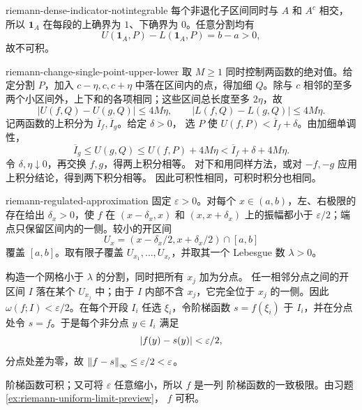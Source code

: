\begin{solution}{riemann-dense-indicator-notintegrable}
每个非退化子区间同时与 \(A\) 和 \(A^c\) 相交，所以
\(\mathbf1_A\) 在每段的上确界为 \(1\)、下确界为 \(0\)。任意分割均有
\[
 U(\mathbf1_A,P)-L(\mathbf1_A,P)=b-a>0,
\]
故不可积。
\end{solution}

\begin{solution}{riemann-change-single-point-upper-lower}
取 \(M\ge1\) 同时控制两函数的绝对值。给定分割 \(P\)，加入
\(c-\eta,c,c+\eta\) 中落在区间内的点，得加细 \(Q\)。除与 \(c\)
相邻的至多两个小区间外，上下和的各项相同；这些区间总长度至多
\(2\eta\)，故
\[
 |U(f,Q)-U(g,Q)|\le4M\eta,\qquad
 |L(f,Q)-L(g,Q)|\le4M\eta.
\]
记两函数的上积分为 \(\overline I_f,\overline I_g\)。给定 \(\delta>0\)，
选 \(P\) 使 \(U(f,P)<\overline I_f+\delta\)。由加细单调性，
\[
 \overline I_g\le U(g,Q)\le U(f,P)+4M\eta
 <\overline I_f+\delta+4M\eta.
\]
令 \(\delta,\eta\downarrow0\)，再交换 \(f,g\)，得两上积分相等。
对下和用同样方法，或对 \(-f,-g\) 应用上积分结论，得到两下积分相等。
因此可积性相同，可积时积分也相同。
\end{solution}

\begin{solution}{riemann-regulated-approximation}
固定 \(\varepsilon>0\)。对每个 \(x\in(a,b)\)，左、右极限的存在给出
\(\delta_x>0\)，使 \(f\) 在
\((x-\delta_x,x)\) 和 \((x,x+\delta_x)\) 上的振幅都小于
\(\varepsilon/2\)；端点只保留区间内的一侧。较小的开区间
\[
 U_x=(x-\delta_x/2,x+\delta_x/2)\cap[a,b]
\]
覆盖 \([a,b]\)。取有限子覆盖
\(U_{x_1},\ldots,U_{x_r}\)，并取其一个 Lebesgue 数 \(\lambda>0\)。

构造一个网格小于 \(\lambda\) 的分割，同时把所有 \(x_j\) 加为分点。
任一相邻分点之间的开区间 \(I\) 落在某个 \(U_{x_j}\) 中；由于 \(I\)
内部不含 \(x_j\)，它完全位于 \(x_j\) 的一侧。因此
\(\omega(f;I)<\varepsilon/2\)。在每个开段 \(I_i\) 任选
\(\xi_i\)，令阶梯函数 \(s=f(\xi_i)\) 于 \(I_i\)，并在分点处令
\(s=f\)。于是每个非分点 \(y\in I_i\) 满足
\[
 \left|f(y)-s(y)\right|<\varepsilon/2,
\]
分点处差为零，故 \(\left\lVert f-s\right\rVert_\infty\le\varepsilon/2<\varepsilon\)。

阶梯函数可积；又可将 \(\varepsilon\) 任意缩小，所以 \(f\) 是一列
阶梯函数的一致极限。由习题 \ref{ex:riemann-uniform-limit-preview}，
\(f\) 可积。
\end{solution}
